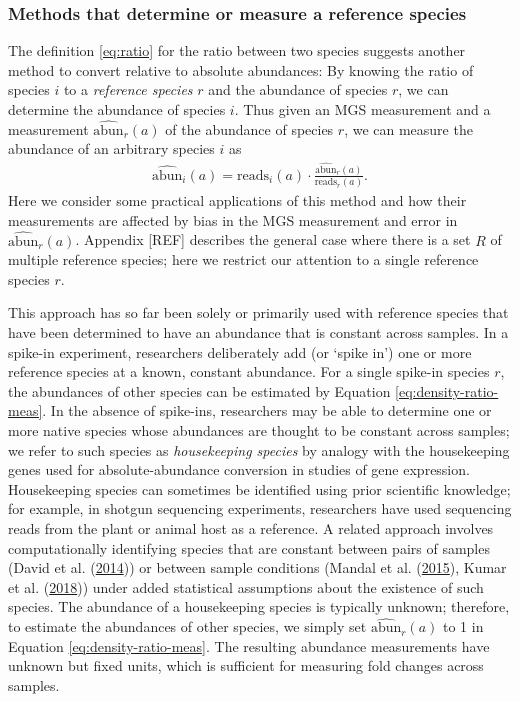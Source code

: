 \documentclass[
]{article}
\begin{document}
\hypertarget{methods-that-determine-or-measure-a-reference-species}{%
\subsubsection{Methods that determine or measure a reference species}\label{methods-that-determine-or-measure-a-reference-species}}

The definition \eqref{eq:ratio} for the ratio between two species suggests another method to convert relative to absolute abundances:
By knowing the ratio of species \(i\) to a \emph{reference species} \(r\) and the abundance of species \(r\), we can determine the abundance of species \(i\).
Thus given an MGS measurement and a measurement \(\widehat{\text{abun}}_{r}(a)\) of the abundance of species \(r\), we can measure the abundance of an arbitrary species \(i\) as
\begin{align}
  \label{eq:density-ratio-meas}
  \widehat{\text{abun}}_{i}(a) = \text{reads}_{i}(a) \cdot \frac{\widehat{\text{abun}}_{r}(a)}{\text{reads}_{r}(a)}.
\end{align}
Here we consider some practical applications of this method and how their measurements are affected by bias in the MGS measurement and error in \(\widehat{\text{abun}}_{r}(a)\).
Appendix {[}REF{]} describes the general case where there is a set \(R\) of multiple reference species; here we restrict our attention to a single reference species \(r\).

This approach has so far been solely or primarily used with reference species that have been determined to have an abundance that is constant across samples.
In a spike-in experiment, researchers deliberately add (or `spike in') one or more reference species at a known, constant abundance.
For a single spike-in species \(r\), the abundances of other species can be estimated by Equation \eqref{eq:density-ratio-meas}.
In the absence of spike-ins, researchers may be able to determine one or more native species whose abundances are thought to be constant across samples; we refer to such species as \emph{housekeeping species} by analogy with the housekeeping genes used for absolute-abundance conversion in studies of gene expression.
Housekeeping species can sometimes be identified using prior scientific knowledge; for example, in shotgun sequencing experiments, researchers have used sequencing reads from the plant or animal host as a reference.
A related approach involves computationally identifying species that are constant between pairs of samples (David et al. (\protect\hyperlink{ref-david2014host}{2014})) or between sample conditions (Mandal et al. (\protect\hyperlink{ref-mandal2015anal}{2015}), Kumar et al. (\protect\hyperlink{ref-kumar2018anal}{2018})) under added statistical assumptions about the existence of such species.
The abundance of a housekeeping species is typically unknown; therefore, to estimate the abundances of other species, we simply set \(\widehat{\text{abun}}_{r}(a)\) to 1 in Equation \eqref{eq:density-ratio-meas}.
The resulting abundance measurements have unknown but fixed units, which is sufficient for measuring fold changes across samples.
\end{document}
